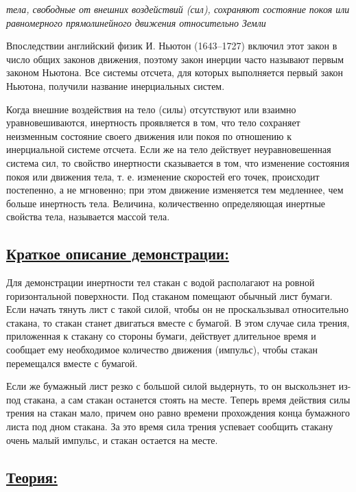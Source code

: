 \documentclass[14pt,a4paper,oneside]{extarticle}	%
\begin{document}
\begin{flushleft}
	
	\textit{тела, свободные от внешних воздействий (сил), сохраняют состояние 
покоя или равномерного прямолинейного движения относительно 
Земли}
\end{flushleft}


Впоследствии английский физик И. Ньютон (1643–1727) включил этот закон в число общих законов движения, поэтому закон инерции часто называют первым законом Ньютона. 
Все системы отсчета, для которых выполняется первый закон 
Ньютона, получили название инерциальных систем. 

Когда внешние воздействия на тело (силы) отсутствуют или взаимно уравновешиваются, инертность проявляется в том, что тело сохраняет неизменным состояние своего движения или покоя по отношению к инерциальной системе отсчета.
Если же на тело действует неуравновешенная система сил, то свойство инертности сказывается в том, что изменение состояния покоя или движения тела, т. е. изменение скоростей его точек, происходит постепенно, а не мгновенно; при этом движение изменяется тем медленнее, чем больше инертность тела.
Величина, количественно определяющая инертные свойства 
тела, называется массой тела. 

\subsection*{\underline{Краткое описание демонстрации:}}

Для демонстрации инертности тел стакан с водой располагают на ровной горизонтальной поверхности.
Под стаканом помещают обычный лист бумаги.
Если начать тянуть лист с такой силой, чтобы он не проскальзывал относительно стакана, то стакан станет двигаться вместе с бумагой.
В этом случае сила трения, приложенная к стакану со стороны бумаги, действует длительное время и сообщает ему  необходимое количество движения (импульс), чтобы стакан перемещался вместе с бумагой. 

Если же бумажный лист резко с большой силой выдернуть, то он выскользнет из-под стакана, 
а сам стакан останется стоять на месте. 
Теперь время действия силы трения на стакан мало, причем оно равно времени прохождения конца 
бумажного листа под дном стакана.
За это время сила трения успевает сообщить стакану очень малый импульс, и стакан остается 
на месте. 

\subsection*{\underline{Теория:}}
\end{document}

